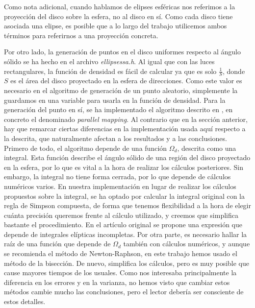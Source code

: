 \documentclass{scrbook}
\begin{document}
Como nota adicional, cuando hablamos de elipses esféricas nos referimos a la proyección del disco sobre la esfera, no al disco en sí. Como cada disco tiene asociada una elipse, es posible que a lo largo del trabajo utilicemos ambos términos para referirnos a una proyección concreta.

Por otro lado, la generación de puntos en el disco uniformes respecto al ángulo sólido se ha hecho en el archivo \textit{ellipsessa.h}. Al igual que con las luces rectangulares, la función de densidad es fácil de calcular ya que es solo $\frac{1}{S}$, donde $S$ es el área del disco proyectado en la esfera de direcciones. Como este valor es necesario en el algoritmo de generación de un punto aleatorio, simplemente la guardamos en una variable para usarla en la función de densidad. Para la generación del punto en sí, se ha implementado el algoritmo descrito en \cite{ur2017}, en concreto el denominado \textit{parallel mapping}. Al contrario que en la sección anterior, hay que remarcar ciertas diferencias en la implementación usada aquí respecto a la descrita, que naturalmente afectan a los resultados y a las conclusiones. Primero de todo, el algoritmo depende de una función $\Omega_d$, descrita como una integral. Esta función describe el ángulo sólido de una región del disco proyectado en la esfera, por lo que es vital a la hora de realizar los cálculos posteriores. Sin embargo, la integral no tiene forma cerrada, por lo que depende de cálculos numéricos varios. En nuestra implementación en lugar de realizar los cálculos propuestos sobre la integral, se ha optado por calcular la integral original con la regla de Simpson compuesta, de forma que tenemos flexibilidad a la hora de elegir cuánta precisión queremos frente al cálculo utilizado, y creemos que simplifica bastante el procedimiento. En el artículo original se propone una expresión que depende de integrales elípticas incompletas. Por otra parte, es necesario hallar la raíz de una función que depende de $\Omega_d$ también con cálculos numéricos, y aunque se recomienda el método de Newton-Raphson, en este trabajo hemos usado el método de la bisección. De nuevo, simplifica los cálculos, pero es muy posible que cause mayores tiempos de los usuales. Como nos interesaba principalmente la diferencia en los errores y en la varianza, no hemos visto que cambiar estos métodos cambie mucho las conclusiones, pero el lector debería ser consciente de estos detalles.
\end{document}
